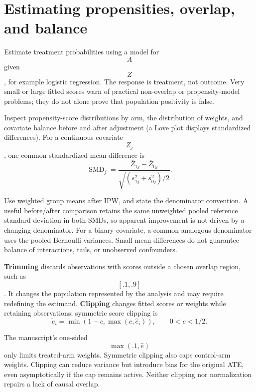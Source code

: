 \section{Estimating propensities, overlap, and balance}
Estimate treatment probabilities using a model for $$A$$ given $$Z$$, for example logistic regression. The response is treatment, not outcome. Very small or large fitted scores warn of practical non-overlap or propensity-model problems; they do not alone prove that population positivity is false.

Inspect propensity-score distributions by arm, the distribution of weights, and covariate balance before and after adjustment (a Love plot displays standardized differences). For a continuous covariate $$Z_j$$, one common standardized mean difference is
\begin{equation}
\operatorname{SMD}_j=
\frac{\overline Z_{1j}-\overline Z_{0j}}
{\sqrt{(s_{1j}^2+s_{0j}^2)/2}}.
\end{equation}
\begin{todo}
Use weighted group means after IPW, and state the denominator convention. A useful before/after comparison retains the same unweighted pooled reference standard deviation in both SMDs, so apparent improvement is not driven by a changing denominator. For a binary covariate, a common analogous denominator uses the pooled Bernoulli variances. Small mean differences do not guarantee balance of interactions, tails, or unobserved confounders.
\end{todo}

\textbf{Trimming} discards observations with scores outside a chosen overlap region, such as $$[.1,.9]$$. It changes the population represented by the analysis and may require redefining the estimand. \textbf{Clipping} changes fitted scores or weights while retaining observations; symmetric score clipping is
\begin{equation}
\widetilde e_i=\min(1-c,\max(c,\widehat e_i)),\qquad 0<c<1/2.
\end{equation}
\begin{correction}
The manuscript's one-sided $$\max(.1,\widehat e)$$ only limits treated-arm weights. Symmetric clipping also caps control-arm weights. Clipping can reduce variance but introduce bias for the original ATE, even asymptotically if the cap remains active. Neither clipping nor normalization repairs a lack of causal overlap.
\end{correction}


